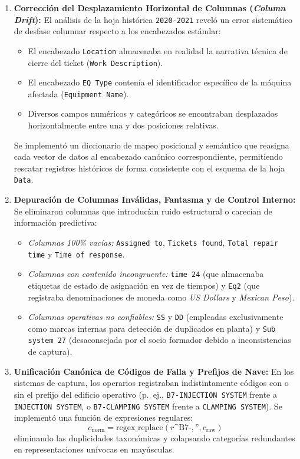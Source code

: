 \documentclass[conference]{IEEEtran}
\begin{document}
\begin{enumerate}
    \item \textbf{Corrección del Desplazamiento Horizontal de Columnas (\textit{Column Drift}):}
    El análisis de la hoja histórica \texttt{2020-2021} reveló un error sistemático de desfase columnar respecto a los encabezados estándar:
    \begin{itemize}
        \item El encabezado \texttt{Location} almacenaba en realidad la narrativa técnica de cierre del ticket (\texttt{Work Description}).
        \item El encabezado \texttt{EQ Type} contenía el identificador específico de la máquina afectada (\texttt{Equipment Name}).
        \item Diversos campos numéricos y categóricos se encontraban desplazados horizontalmente entre una y dos posiciones relativas.
    \end{itemize}
    Se implementó un diccionario de mapeo posicional y semántico que reasigna cada vector de datos al encabezado canónico correspondiente, permitiendo rescatar registros históricos de forma consistente con el esquema de la hoja \texttt{Data}.

    \item \textbf{Depuración de Columnas Inválidas, Fantasma y de Control Interno:}
    Se eliminaron columnas que introducían ruido estructural o carecían de información predictiva:
    \begin{itemize}
        \item \textit{Columnas 100\% vacías:} \texttt{Assigned to}, \texttt{Tickets found}, \texttt{Total repair time} y \texttt{Time of response}.
        \item \textit{Columnas con contenido incongruente:} \texttt{time 24} (que almacenaba etiquetas de estado de asignación en vez de tiempos) y \texttt{Eq2} (que registraba denominaciones de moneda como \textit{US Dollars} y \textit{Mexican Peso}).
        \item \textit{Columnas operativas no confiables:} \texttt{SS} y \texttt{DD} (empleadas exclusivamente como marcas internas para detección de duplicados en planta) y \texttt{Sub system 27} (desaconsejada por el socio formador debido a inconsistencias de captura).
    \end{itemize}

    \item \textbf{Unificación Canónica de Códigos de Falla y Prefijos de Nave:}
    En los sistemas de captura, los operarios registraban indistintamente códigos con o sin el prefijo del edificio operativo (p.~ej., \texttt{B7-INJECTION SYSTEM} frente a \texttt{INJECTION SYSTEM}, o \texttt{B7-CLAMPING SYSTEM} frente a \texttt{CLAMPING SYSTEM}). Se implementó una función de expresiones regulares:
    \begin{equation}
        c_{\text{norm}} = \text{regex\_replace}(r\text{\textasciicircum B7-}, \text{''}, c_{\text{raw}})
    \end{equation}
    eliminando las duplicidades taxonómicas y colapsando categorías redundantes en representaciones unívocas en mayúsculas.


\end{enumerate}
\end{document}
